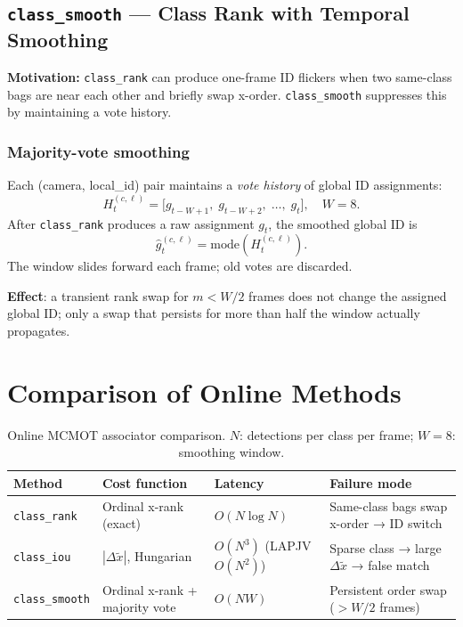 \documentclass[11pt,a4paper]{article}
\newcommand{\code}[1]{\texttt{\small#1}}
\begin{document}
\subsection{\texttt{class\_smooth} — Class Rank with Temporal Smoothing}

\textbf{Motivation:} \texttt{class\_rank} can produce one-frame ID flickers
when two same-class bags are near each other and briefly swap x-order.
\texttt{class\_smooth} suppresses this by maintaining a vote history.

\subsubsection*{Majority-vote smoothing}
Each (camera, local\_id) pair maintains a \emph{vote history} of global ID
assignments:
\begin{equation}
  H_t^{(c,\ell)} = \bigl[g_{t-W+1},\; g_{t-W+2},\; \ldots,\; g_t\bigr],
  \quad W = 8.
\end{equation}
After \texttt{class\_rank} produces a raw assignment $g_t$, the smoothed
global ID is
\begin{equation}
  \boxed{\hat{g}_t^{(c,\ell)} = \text{mode}\!\left(H_t^{(c,\ell)}\right).}
  \label{eq:smooth}
\end{equation}
The window slides forward each frame; old votes are discarded.

\textbf{Effect}: a transient rank swap for $m < W/2$ frames does not change
the assigned global ID; only a swap that persists for more than half the
window actually propagates.

\section{Comparison of Online Methods}

\begin{table}[h]
\centering
\renewcommand{\arraystretch}{1.4}
\begin{tabularx}{\linewidth}{L{2.8cm} L{3.2cm} C{1.6cm} L{5.4cm}}
\toprule
\textbf{Method} & \textbf{Cost function} & \textbf{Latency} & \textbf{Failure mode} \\
\midrule
\code{class\_rank}
  & Ordinal x-rank (exact)
  & $O(N\log N)$
  & Same-class bags swap x-order → ID switch \\
\code{class\_iou}
  & $|\Delta\tilde{x}|$, Hungarian
  & $O(N^3)$ (LAPJV $O(N^2)$)
  & Sparse class → large $\Delta\tilde{x}$ → false match \\
\code{class\_smooth}
  & Ordinal x-rank + majority vote
  & $O(NW)$
  & Persistent order swap ($> W/2$ frames) \\
\bottomrule
\end{tabularx}
\caption{Online MCMOT associator comparison.  $N$: detections per class per
  frame; $W=8$: smoothing window.}
\end{table}
\end{document}
